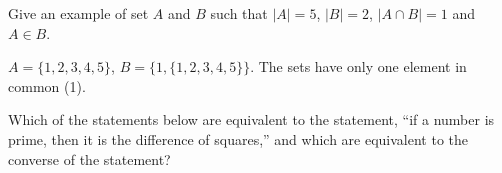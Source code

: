 \begin{squestions}

  \begin{answer}
  \end{answer}



\question Give an example of set $A$ and $B$ such that $|A| = 5$, $|B| = 2$, $|A \cap B| = 1$ and $A \in B$.

  \begin{answer}
  $A = \{1,2,3,4,5\}$, $B = \{1, \{1,2,3,4,5\}\}$.  The sets have only one element in common (1).
  \end{answer}





\question Which of the statements below are equivalent to the statement, ``if a number is prime, then it is the difference of squares,'' and which are equivalent to the converse of the statement?  
\end{squestions}
